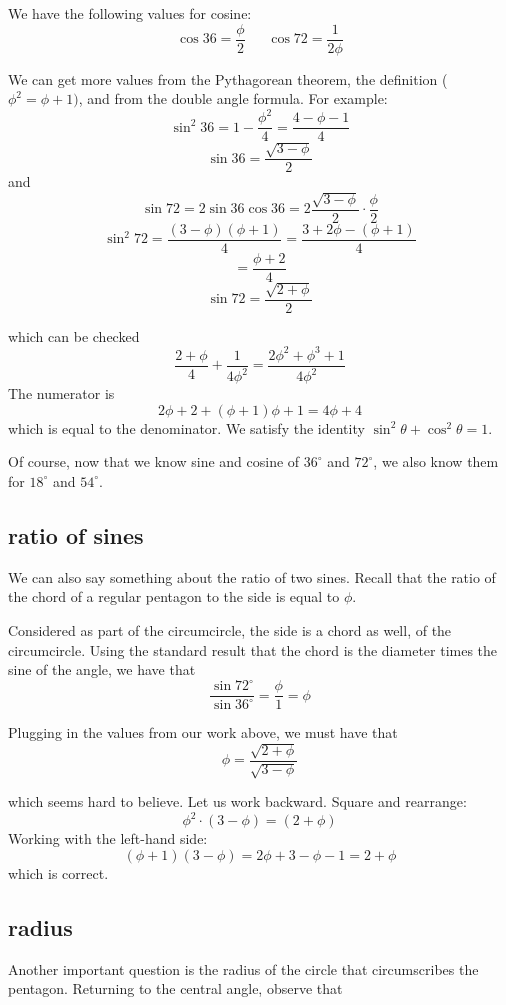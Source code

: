 \documentclass[11pt, oneside]{article}
\begin{document}
We have the following values for cosine:
\[ \cos 36 = \frac{\phi}{2} \ \ \ \ \ \ \  \cos 72 = \frac{1}{2 \phi}  \]

We can get more values from the Pythagorean theorem, the definition ($\phi^2 = \phi + 1)$, and from the double angle formula.  For example:
\[ \sin^2 36 = 1 - \frac{\phi^2}{4}  = \frac{4 - \phi - 1}{4} \]
\[ \sin 36 = \frac{\sqrt{3 - \phi}}{2} \]
and
\[ \sin 72 = 2 \sin 36 \cos 36 =  2  \frac{\sqrt{3 - \phi}}{2} \cdot \frac{\phi}{2}  \]
\[ \sin^2 72 = \frac{(3-\phi)(\phi + 1)}{4} = \frac{3 + 2 \phi - (\phi + 1)}{4}\]
\[ = \frac{\phi + 2}{4} \]
\[ \sin 72 = \frac{\sqrt{2 + \phi}}{2} \]

which can be checked
\[ \frac{2 + \phi}{4} + \frac{1}{4 \phi^2} = \frac{2 \phi^2 + \phi^3 + 1}{4 \phi^2} \]
The numerator is
\[ 2 \phi + 2 + (\phi + 1)\phi + 1 = 4 \phi + 4 \]
which is equal to the denominator.  We satisfy the identity $\sin^2 \theta + \cos^2 \theta = 1$.

Of course, now that we know sine and cosine of $36^\circ$ and $72^\circ$, we also know them for $18^\circ$ and $54^\circ$.

\subsection*{ratio of sines}

We can also say something about the ratio of two sines.  Recall that the ratio of the chord of a regular pentagon to the side is equal to $\phi$.

Considered as part of the circumcircle, the side is a chord as well, of the circumcircle.  Using the standard result that the chord is the diameter times the sine of the angle, we have that
\[ \frac{\sin 72^\circ}{\sin 36^\circ} = \frac{\phi}{1} = \phi \]

Plugging in the values from our work above, we must have that
\[ \phi = \frac{\sqrt{2 + \phi}}{\sqrt{3 - \phi}} \]

which seems hard to believe.  Let us work backward.  Square and rearrange:
\[ \phi^2 \cdot (3 - \phi)= (2 + \phi) \]
Working with the left-hand side:
\[ (\phi + 1)(3 - \phi) = 2 \phi + 3 -  \phi - 1 = 2 + \phi \]
which is correct.

\subsection*{radius}

Another important question is the radius of the circle that circumscribes the pentagon.  Returning to the central angle, observe that
\end{document}
